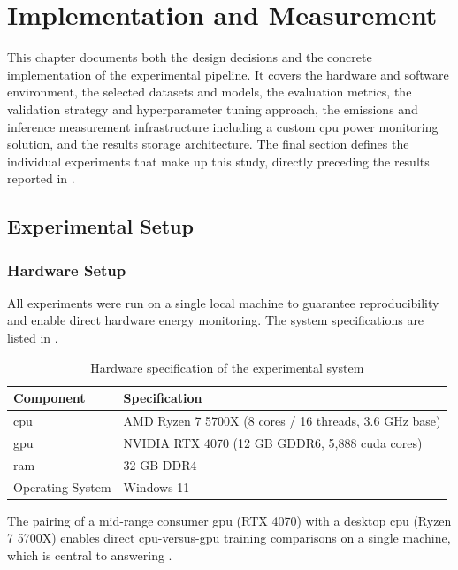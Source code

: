 \chapter{Implementation and Measurement}
\label{implementation}


This chapter documents both the design decisions and the concrete implementation of the experimental pipeline. It covers the hardware and software environment, the selected datasets and models, the evaluation metrics, the validation strategy and hyperparameter tuning approach, the emissions and inference measurement infrastructure including a custom \gls{cpu} power monitoring solution, and the results storage architecture. The final section defines the individual experiments that make up this study, directly preceding the results reported in .

\section{Experimental Setup}

\subsection{Hardware Setup}
\label{sec:implementation_hardware}

All experiments were run on a single local machine to guarantee reproducibility and enable direct hardware energy monitoring. The system specifications are listed in .

\begin{table}[htbp]
\centering
\caption{Hardware specification of the experimental system}
\label{tab:hardware}
\begin{tabular}{ll}
\toprule
\textbf{Component} & \textbf{Specification} \\
\midrule
\gls{cpu} & AMD Ryzen 7 5700X (8 cores / 16 threads, 3.6 GHz base) \\
\gls{gpu} & NVIDIA RTX 4070 (12 GB GDDR6, 5{,}888 \gls{cuda} cores) \\
\gls{ram} & 32 GB DDR4 \\
Operating System & Windows 11 \\
\bottomrule
\end{tabular}
\end{table}

The pairing of a mid-range consumer \gls{gpu} (RTX 4070) with a desktop \gls{cpu} (Ryzen 7 5700X) enables direct \gls{cpu}-versus-\gls{gpu} training comparisons on a single machine, which is central to answering .

